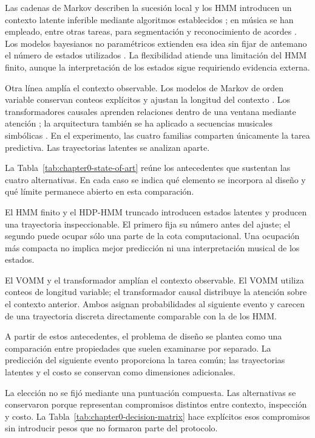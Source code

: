 Las cadenas de Markov describen la sucesión local y los HMM introducen un contexto latente inferible mediante algoritmos establecidos \cite{rabiner1989,cappe2005}; en música se han empleado, entre otras tareas, para segmentación y reconocimiento de acordes \cite{sheh2003}. Los modelos bayesianos no paramétricos extienden esa idea sin fijar de antemano el número de estados utilizados \cite{teh2006,fox2011}. La flexibilidad atiende una limitación del HMM finito, aunque la interpretación de los estados sigue requiriendo evidencia externa.

Otra línea amplía el contexto observable. Los modelos de Markov de orden variable conservan conteos explícitos y ajustan la longitud del contexto \cite{begleiter2004}. Los transformadores causales aprenden relaciones dentro de una ventana mediante atención \cite{vaswani2017}; la arquitectura también se ha aplicado a secuencias musicales simbólicas \cite{huang2018musictransformer}. En el experimento, las cuatro familias comparten únicamente la tarea predictiva. Las trayectorias latentes se analizan aparte.

La Tabla~\ref{tab:chapter0-state-of-art} reúne los antecedentes que sustentan las cuatro alternativas. En cada caso se indica qué elemento se incorpora al diseño y qué límite permanece abierto en esta comparación.

El HMM finito y el HDP-HMM truncado introducen estados latentes y producen una trayectoria inspeccionable. El primero fija su número antes del ajuste; el segundo puede ocupar sólo una parte de la cota computacional. Una ocupación más compacta no implica mejor predicción ni una interpretación musical de los estados.

El VOMM y el transformador amplían el contexto observable. El VOMM \cite{begleiter2004} utiliza conteos de longitud variable; el transformador causal \cite{vaswani2017,huang2018musictransformer} distribuye la atención sobre el contexto anterior. Ambos asignan probabilidades al siguiente evento y carecen de una trayectoria discreta directamente comparable con la de los HMM.



A partir de estos antecedentes, el problema de diseño se plantea como una comparación entre propiedades que suelen examinarse por separado. La predicción del siguiente evento proporciona la tarea común; las trayectorias latentes y el costo se conservan como dimensiones adicionales.

La elección no se fijó mediante una puntuación compuesta. Las alternativas se conservaron porque representan compromisos distintos entre contexto, inspección y costo. La Tabla~\ref{tab:chapter0-decision-matrix} hace explícitos esos compromisos sin introducir pesos que no formaron parte del protocolo.

